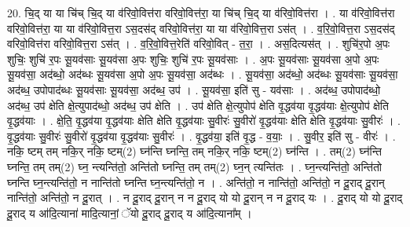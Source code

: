 \documentclass[17pt]{extarticle}
\begin{document}
20. चि॒द् या या चि॑च् चि॒द् या व॑रिवो॒वित्त॑रा वरिवो॒वित्त॑रा॒ या चि॑च् चि॒द् या व॑रिवो॒वित्त॑रा । . या व॑रिवो॒वित्त॑रा वरिवो॒वित्त॑रा॒ या या व॑रिवो॒वित्त॒रा ऽस॒दस॑द् वरिवो॒वित्त॑रा॒ या या व॑रिवो॒वित्त॒रा ऽस॑त् । . व॒रि॒वो॒वित्त॒रा ऽस॒दस॑द् वरिवो॒वित्त॑रा वरिवो॒वित्त॒रा ऽस॑त् । . व॒रि॒वो॒वित्त॒रेति॑ वरिवो॒वित् - त॒रा॒ । . अस॒दित्यस॑त् । . शुचि॑र॒पो अ॒पः शुचिः॒ शुचि॑ र॒पः सू॒यव॑साः सू॒यव॑सा अ॒पः शुचिः॒ शुचि॑ र॒पः सू॒यव॑साः । . अ॒पः सू॒यव॑साः सू॒यव॑सा अ॒पो अ॒पः सू॒यव॑सा॒ अद॑ब्धो॒ अद॑ब्धः सू॒यव॑सा अ॒पो अ॒पः सू॒यव॑सा॒ अद॑ब्धः । . सू॒यव॑सा॒ अद॑ब्धो॒ अद॑ब्धः सू॒यव॑साः सू॒यव॑सा॒ अद॑ब्ध॒ उपोपाद॑ब्धः सू॒यव॑साः सू॒यव॑सा॒ अद॑ब्ध॒ उप॑ । . सू॒यव॑सा॒ इति॑ सु - यव॑साः । . अद॑ब्ध॒ उपोपाद॑ब्धो॒ अद॑ब्ध॒ उप॑ क्षेति क्षे॒त्युपाद॑ब्धो॒ अद॑ब्ध॒ उप॑ क्षेति । . उप॑ क्षेति क्षे॒त्युपोप॑ क्षेति वृ॒द्धव॑या वृ॒द्धव॑याः क्षे॒त्युपोप॑ क्षेति वृ॒द्धव॑याः । . क्षे॒ति॒ वृ॒द्धव॑या वृ॒द्धव॑याः क्षेति क्षेति वृ॒द्धव॑याः सु॒वीरः॑ सु॒वीरो॑ वृ॒द्धव॑याः क्षेति क्षेति वृ॒द्धव॑याः सु॒वीरः॑ । . वृ॒द्धव॑याः सु॒वीरः॑ सु॒वीरो॑ वृ॒द्धव॑या वृ॒द्धव॑याः सु॒वीरः॑ । . वृ॒द्धव॑या॒ इति॑ वृ॒द्ध - व॒याः॒ । . सु॒वीर॒ इति॑ सु - वीरः॑ । . नकि॒ ष्टम् तम् नकि॒र् नकि॒ ष्टम्(2) घ्न॑न्ति घ्नन्ति॒ तम् नकि॒र् नकि॒ ष्टम्(2) घ्न॑न्ति । . तम्(2) घ्न॑न्ति घ्नन्ति॒ तम् तम्(2) घ्न॒ न्त्यन्ति॑तो॒ अन्ति॑तो घ्नन्ति॒ तम् तम्(2) घ्न॒न् त्यन्ति॑तः । . घ्न॒न्त्यन्ति॑तो॒ अन्ति॑तो घ्नन्ति घ्न॒न्त्यन्ति॑तो॒ न नान्ति॑तो घ्नन्ति घ्न॒न्त्यन्ति॑तो॒ न । . अन्ति॑तो॒ न नान्ति॑तो॒ अन्ति॑तो॒ न दू॒राद् दू॒रान् नान्ति॑तो॒ अन्ति॑तो॒ न दू॒रात् । . न दू॒राद् दू॒रान् न न दू॒राद् यो यो दू॒रान् न न दू॒राद् यः । . दू॒राद् यो यो दू॒राद् दू॒राद् य आ॑दि॒त्याना॑ मादि॒त्यानां॒ ॅयो दू॒राद् दू॒राद् य आ॑दि॒त्याना᳚म् । \newline
\end{document}
